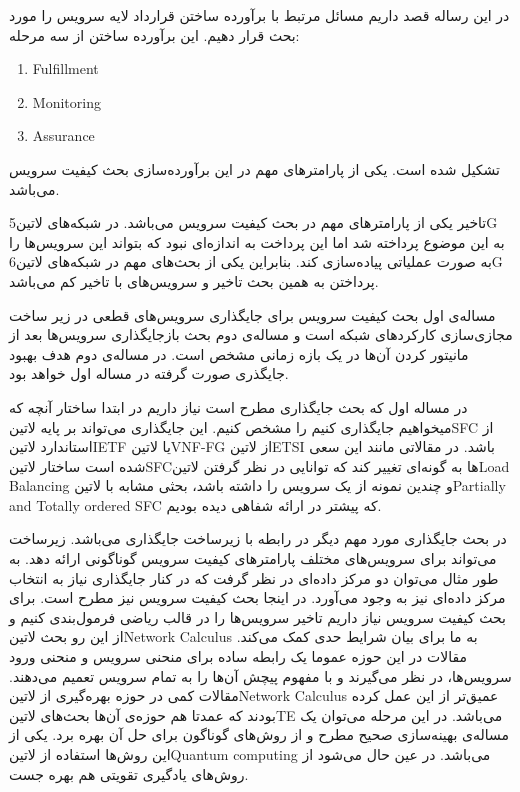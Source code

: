 \documentclass{book}
\begin{document}

در این رساله قصد داریم مسائل مرتبط با برآورده ساختن قرارداد لایه سرویس را مورد بحث قرار دهیم. این برآورده ساختن از سه مرحله:

\begin{latin}\begin{enumerate}
   \item Fulfillment
   \item Monitoring
   \item Assurance
\end{enumerate}\end{latin}

تشکیل شده است. یکی از پارامترهای مهم در این برآورده‌سازی بحث کیفیت سرویس می‌باشد.

تاخیر یکی از پارامترهای مهم در بحث کیفیت سرویس می‌باشد. در شبکه‌های ‌لاتین{5G} به این موضوع پرداخته شد اما این پرداخت به اندازه‌ای نبود که بتواند این سرویس‌ها را به صورت عملیاتی پیاده‌سازی کند.
بنابراین یکی از بحث‌های مهم در شبکه‌های ‌لاتین{6G} پرداختن به همین بحث تاخیر و سرویس‌های با تاخیر کم می‌باشد.

مساله‌ی اول بحث کیفیت سرویس برای جایگذاری سرویس‌های قطعی در زیر ساخت مجازی‌سازی کارکردهای شبکه است و مساله‌ی دوم بحث بازجایگذاری سرویس‌ها بعد از مانیتور کردن آن‌ها در یک بازه زمانی مشخص است.
در مساله‌ی دوم هدف بهبود جایگذری صورت گرفته در مساله اول خواهد بود.

در مساله اول که بحث جایگذاری مطرح است نیاز داریم در ابتدا ساختار آنچه که میخواهیم جایگذاری کنیم را مشخص کنیم. این جایگذاری می‌تواند بر پایه ‌لاتین{SFC} از استاندارد ‌لاتین{IETF} یا ‌لاتین{VNF-FG} از ‌لاتین{ETSI} باشد.
در مقالاتی مانند این سعی شده است ساختار ‌لاتین{SFC}ها به گونه‌ای تغییر کند که توانایی در نظر گرفتن ‌لاتین{Load Balancing} و چندین نمونه از یک سرویس را داشته باشد، بحثی مشابه با ‌لاتین{Partially and Totally ordered SFC} که پیشتر در ارائه شفاهی دیده بودیم.

در بحث جایگذاری مورد مهم دیگر در رابطه با زیرساخت جایگذاری می‌باشد. زیرساخت می‌تواند برای سرویس‌های مختلف پارامترهای کیفیت سرویس گوناگونی ارائه دهد. به طور مثال می‌توان دو مرکز داده‌ای در نظر گرفت که در کنار جایگذاری نیاز به انتخاب مرکز داده‌ای نیز به وجود می‌آورد.
در اینجا بحث کیفیت سرویس نیز مطرح است. برای بحث کیفیت سرویس نیاز داریم تاخیر سرویس‌ها را در قالب ریاضی فرمول‌بندی کنیم و از این رو بحث ‌لاتین{Network Calculus} به ما برای بیان شرایط حدی کمک می‌کند.
مقالات در این حوزه عموما یک رابطه ساده برای منحنی سرویس و منحنی ورود سرویس‌ها، در نظر می‌گیرند و با مفهوم پیچش آن‌ها را به تمام سرویس تعمیم می‌دهند. مقالات کمی در حوزه بهره‌گیری از ‌لاتین{Network Calculus} عمیق‌تر از این عمل کرده بودند که عمدتا هم حوزه‌ی آن‌ها بحث‌های ‌لاتین{TE} می‌باشد.
در این مرحله می‌توان یک مساله‌ی بهینه‌سازی صحیح مطرح و از روش‌های گوناگون برای حل آن بهره برد. یکی از این روش‌ها استفاده از ‌لاتین{Quantum computing} می‌باشد. در عین حال می‌شود از روش‌های یادگیری تقویتی هم بهره جست.
\end{document}

